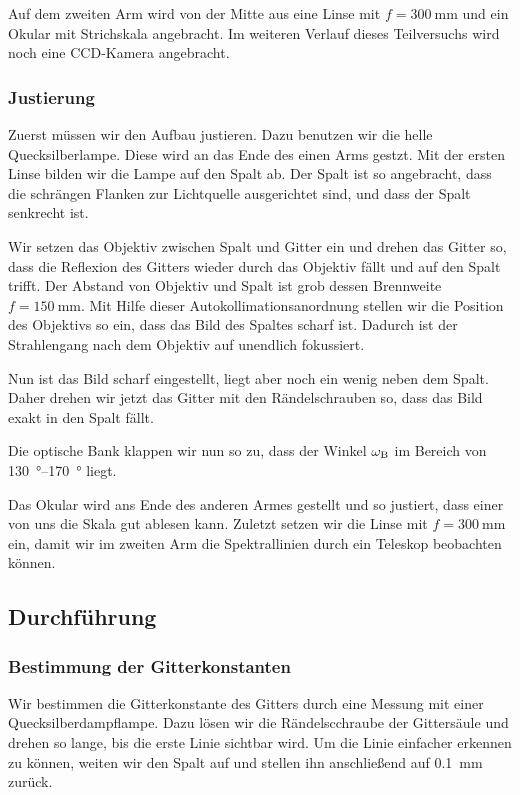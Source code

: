 Auf dem zweiten Arm wird von der Mitte aus eine Linse mit $f =
\SI{300}{\milli\meter}$ und ein Okular mit Strichskala angebracht. Im weiteren
Verlauf dieses Teilversuchs wird noch eine CCD-Kamera angebracht.

\FloatBarrier
\subsubsection{Justierung}

Zuerst müssen wir den Aufbau justieren. Dazu benutzen wir die helle
Quecksilberlampe. Diese wird an das Ende des einen Arms gestzt. Mit der ersten
Linse bilden wir die Lampe auf den Spalt ab. Der Spalt ist so angebracht, dass
die schrängen Flanken zur Lichtquelle ausgerichtet sind, und dass der Spalt
senkrecht ist.

Wir setzen das Objektiv zwischen Spalt und Gitter ein und drehen das Gitter so,
dass die Reflexion des Gitters wieder durch das Objektiv fällt und auf den
Spalt trifft. Der Abstand von Objektiv und Spalt ist grob dessen Brennweite $f
= \SI{150}{\milli\meter}$. Mit Hilfe dieser Autokollimationsanordnung stellen
wir die Position des Objektivs so ein, dass das Bild des Spaltes scharf ist.
Dadurch ist der Strahlengang nach dem Objektiv auf unendlich fokussiert.

Nun ist das Bild scharf eingestellt, liegt aber noch ein wenig neben dem Spalt.
Daher drehen wir jetzt das Gitter mit den Rändelschrauben so, dass das Bild
exakt in den Spalt fällt.

Die optische Bank klappen wir nun so zu, dass der Winkel $\omega_\text B$ im
Bereich von \SIrange{130}{170}{\degree} liegt.

Das Okular wird ans Ende des anderen Armes gestellt und so justiert, dass einer
von uns die Skala gut ablesen kann. Zuletzt setzen wir die Linse mit $f =
\SI{300}{\milli\meter}$ ein, damit wir im zweiten Arm die Spektrallinien durch
ein Teleskop beobachten können.

\FloatBarrier
\subsection{Durchführung}

\FloatBarrier
\subsubsection{Bestimmung der Gitterkonstanten}
\label{sec:gitterkonstante/durchführung}

Wir bestimmen die Gitterkonstante des Gitters durch eine Messung mit einer
Quecksilberdampflampe. Dazu lösen wir die Rändelscchraube der Gittersäule und
drehen so lange, bis die erste Linie sichtbar wird. Um die Linie einfacher
erkennen zu können, weiten wir den Spalt auf und stellen ihn anschließend auf
\SI{0.1}{\milli\meter} zurück.

